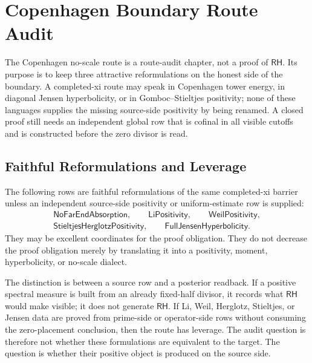 \chapter{Copenhagen Boundary Route Audit}
\label{ch:visions-rh-copenhagen-boundary-route-audit}

The Copenhagen no-scale route is a route-audit chapter, not a proof of
$\mathsf{RH}$.  Its purpose is to keep three attractive reformulations on
the honest side of the boundary.  A completed-xi route may speak in
Copenhagen tower energy, in diagonal Jensen hyperbolicity, or in
Gomboc--Stieltjes positivity; none of these languages supplies the missing
source-side positivity by being renamed.  A closed proof still needs an
independent global row that is cofinal in all visible cutoffs and is
constructed before the zero divisor is read.

\section{Faithful Reformulations and Leverage}
\label{sec:rh-copenhagen-faithful-reformulations}

\begin{principle}
\label{prin:rh-faithful-reformulations-not-leverage}
The following rows are faithful reformulations of the same completed-xi
barrier unless an independent source-side positivity or uniform-estimate
row is supplied:
$$
\begin{gathered}
\mathsf{NoFarEndAbsorption},\qquad
\mathsf{LiPositivity},\qquad
\mathsf{WeilPositivity},\\
\mathsf{StieltjesHerglotzPositivity},\qquad
\mathsf{FullJensenHyperbolicity}.
\end{gathered}
$$
They may be excellent coordinates for the proof obligation.  They do not
decrease the proof obligation merely by translating it into a positivity,
moment, hyperbolicity, or no-scale dialect.
\end{principle}

The distinction is between a source row and a posterior readback.  If a
positive spectral measure is built from an already fixed-half divisor, it
records what $\mathsf{RH}$ would make visible; it does not generate
$\mathsf{RH}$.  If Li, Weil, Herglotz, Stieltjes, or Jensen data are proved
from prime-side or operator-side rows without consuming the zero-placement
conclusion, then the route has leverage.  The audit question is therefore
not whether these formulations are equivalent to the target.  The question
is whether their positive object is produced on the source side.

